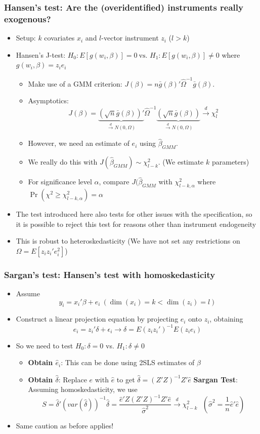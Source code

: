 \documentclass[aspectratio=169]{beamer}
\begin{document}
\begin{frame}
\frametitle{Hansen's test: Are the (overidentified) instruments really exogenous?}
\begin{itemize}
\item Setup: $k$ covariates $x_i$ and $l$-vector instrument $z_i$ ($l>k$)
\item Hansen's J-test: $H_0: E[g(w_i,\beta)]=0 \ \text{vs. } H_1: E[g(w_i,\beta)]\neq0$ where $g(w_i,\beta)=z_ie_i$
\begin{itemize}
\item Make use of a GMM criterion: $J(\beta)=n\bar{g}(\beta)'\widehat{\Omega}^{-1}\bar{g}(\beta)$. 
\item Asymptotics: 
\[
J(\beta)= \underbrace{\left(\sqrt{n}\bar{g}(\beta) \right)'}_{\xrightarrow{d}N(0,\Omega)} \widehat{\Omega}^{-1}\underbrace{\left(\sqrt{n}\bar{g}(\beta) \right)}_{\xrightarrow{d}N(0,\Omega)}\xrightarrow{d} \chi^2_l
\]
\item However, we need an estimate of $e_i$ using $\hat{\beta}_{GMM}$.
\item We really do this with $J(\hat{\beta}_{GMM})\sim  \chi_{l-k}^2$. (We estimate $k$ parameters)
\item For significance level $\alpha$, compare $J(\hat{\beta}_{GMM}$ with $\chi_{l-k, \alpha}^2$ where $\Pr(\chi^2\geq\chi_{l-k, \alpha}^2) = \alpha$
\end{itemize}
\item The test introduced here also tests for other issues with the specification, so it is possible to reject this test for reasons other than instrument endogeneity
\item This is robust to heteroskedasticity (We have not set any restrictions on $\Omega = E[z_iz_i'e_i^2]$)
\end{itemize}
\end{frame}

\begin{frame}
\frametitle{Sargan's test: Hansen's test with homoskedasticity}
\begin{itemize}
\item Assume
\[
y_i = x_i'\beta+e_i \ (\dim(x_i)=k<\dim(z_i)=l) 
\]
\item Construct a linear projection equation by projecting $e_i$ onto $z_i$, obtaining
\[
e_i=z_i'\delta+\epsilon_i \to\delta=E(z_iz_i')^{-1}E(z_ie_i)
\]
\item So we need to test $H_0: \delta=0$ vs. $H_1: \delta\neq0$
\begin{itemize}
\item  \textbf{Obtain $\hat{e}_i$}: This can be done using 2SLS estimates of $\beta$
\item \textbf{Obtain $\hat{\delta}$}: Replace $e$ with $\hat{e}$ to get $\hat{\delta} = (Z'Z)^{-1}Z'\hat{e}$
\textbf{Sargan Test}: Assuming homoskedasticity, we use 
\[
S=\hat{\delta}'(var(\hat{\delta}))^{-1}\hat{\delta}=\frac{\hat{e}'Z(Z'Z)^{-1}Z'\hat{e}}{\hat{\sigma}^2}\xrightarrow{d}\chi_{l-k}^2 \  \ \ (\hat{\sigma}^2=\frac{1}{n}\hat{e}'\hat{e})
\]
\end{itemize}
\item Same caution as before applies!
\end{itemize}
\end{frame}
\end{document}
